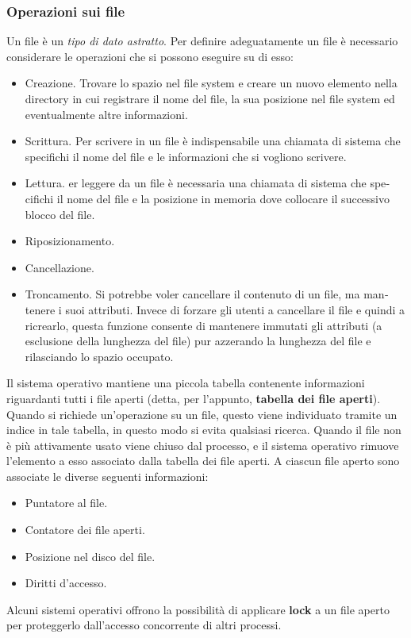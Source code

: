 \documentclass[11pt,a4paper]{article}
\begin{document}
{\subsubsection{Operazioni sui file}
Un file è un \emph{tipo di dato astratto}. Per definire adeguatamente un file è necessario conside­rare le operazioni che si possono eseguire su di esso:
\begin{itemize}
  \item Creazione. Trovare lo spazio nel file system e crea­re un nuovo elemento nella directory in cui registrare il nome del file, la sua posizione nel file system ed eventualmente altre informazioni.
  \item Scrittura. Per scrivere in un file è indispensabile una chiamata di sistema che specifichi il nome del file e le informazioni che si vogliono scrivere.
  \item Lettura. er leggere da un file è necessaria una chiamata di sistema che spe­cifichi il nome del file e la posizione in memoria dove collocare il successivo blocco del file.
  \item Riposizionamento.
  \item Cancellazione.
  \item Troncamento. Si potrebbe voler cancellare il contenuto di un file, ma man­tenere i suoi attributi. Invece di forzare gli utenti a cancellare il file e quindi a ricrear­lo, questa funzione consente di mantenere immutati gli attributi (a esclusione della lunghezza del file) pur azzerando la lunghezza del file e rilasciando lo spazio occupato.
\end{itemize}
%
Il sistema operativo mantiene una piccola tabella contenente informa­zioni riguardanti tutti i file aperti (detta, per l'appunto, \textbf{tabella dei file aperti}). Quando si
richiede un'operazione su un file, questo viene individuato tramite un indice in tale tabella,
in questo modo si evita qualsiasi ricerca. Quando il file non è più attivamente usato viene
chiuso dal processo, e il sistema operativo rimuove l'elemento a esso associato dalla tabella
dei file aperti.
A ciascun file aperto sono associate le diverse seguenti informazioni:
\begin{itemize}
  \item Puntatore al file.
  \item Contatore dei file aperti.
  \item Posizione nel disco del file.
  \item Diritti d'accesso.
\end{itemize}
%
Alcuni sistemi operativi offrono la possibilità di applicare \textbf{lock} a un file aperto per proteggerlo dall'accesso concorrente di altri pro­cessi.

}
\end{document}
